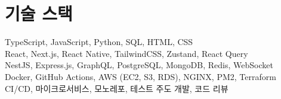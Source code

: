 \section{기술 스택}
\begin{itemize}[leftmargin=0.15in, label={}]
\small{
    \item{
        TypeScript, JavaScript, Python, SQL, HTML, CSS \\
        React, Next.js, React Native, TailwindCSS, Zustand, React Query \\
        NestJS, Express.js, GraphQL, PostgreSQL, MongoDB, Redis, WebSocket \\
        Docker, GitHub Actions, AWS (EC2, S3, RDS), NGINX, PM2, Terraform \\
        CI/CD, 마이크로서비스, 모노레포, 테스트 주도 개발, 코드 리뷰
    }
}
\end{itemize}
